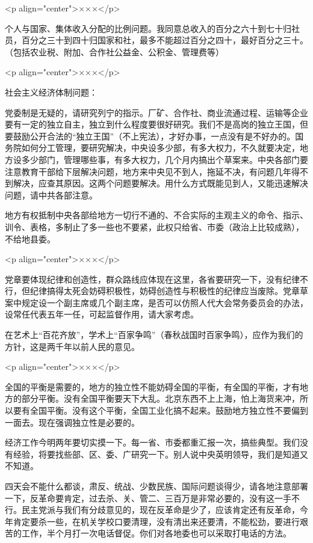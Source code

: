 <p align="center">×××</p>

个人与国家、集体收入分配的比例问题。我同意总收入的百分之六十到七十归社员，百分之三十到四十归国家和社，最多不能超过百分之四十，最好百分之三十。（包括农业税、附加、合作社公益金、公积金、管理费等）

<p align="center">×××</p>

社会主义经济体制问题：

党委制是无疑的，请研究列宁的指示。厂矿、合作社、商业流通过程、运输等企业要有一定的独立自主，独立到什么程度要很好研究。我们不是高岗的独立王国，但要鼓励公开合法的“独立王国”（不上宪法），才好办事，一点没有是不好办的。国务院如何分工管理，要研究解决，中央设多少部，有多大权力，不久就要决定，地方设多少部门，管理哪些事，有多大权力，几个月内搞出个草案来。中央各部门要注意教育干部给下层解决问题，地方来中央见不到人，拖延不决，有问题几年得不到解决，应查其原因。这两个问题要解决。用什么方式既能见到人，又能迅速解决问题，请中共各部注意。

地方有权抵制中央各部给地方一切行不通的、不合实际的主观主义的命令、指示、训令、表格，多制止了多一些也不要紧，此权只给省、市委（政治上比较成熟），不给地县委。

<p align="center">×××</p>

党章要体现纪律和创造性，群众路线应体现在这里，各省要研究一下，没有纪律不行，但纪律搞得太死会妨碍积极性，妨碍创造性与积极性的纪律应当废除。党章草案中规定设一个副主席或几个副主席，是否可以仿照人代大会常务委员会的办法，设常任代表五年一任，可起监督作用，请大家考虑。

在艺术上“百花齐放”，学术上“百家争鸣”（春秋战国时百家争鸣），应作为我们的方针，这是两千年以前人民的意见。

<p align="center">×××</p>

全国的平衡是需要的，地方的独立性不能妨碍全国的平衡，有全国的平衡，才有地方的部分平衡。没有全国平衡要天下大乱。北京东西不上上海，怕上海货来冲，所以要有全国平衡。没有这个平衡，全国工业化搞不起来。鼓励地方独立性不要偏到一面去。现在强调独立性是必要的。

经济工作今明两年要切实摸一下。每一省、市委都重汇报一次，搞些典型。我们没有经验，将要找些部、区、委、广研究一下。别人说中央英明领导，我们是知道又不知道。

四天会不能什么都谈，肃反、统战、少数民族、国际问题谈得少，请各地注意部署一下，反革命要肯定，过去杀、关、管二、三百万是非常必要的，没有这一手不行。民主党派与我们有分歧意见的，现在反革命是少了，应该肯定还有反革命，今年肯定要杀一些，在机关学校口要清理，没有清出来还要清，不能松劲，要进行艰苦的工作，半个月打一次电话督促。你们对各地委也可以采取打电话的方法。

